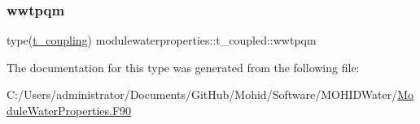 \mbox{\label{structmodulewaterproperties_1_1t__coupled_ad6256124275217622e92407a6bdac5ab}} 
\subsubsection{\texorpdfstring{wwtpqm}{wwtpqm}}
{\footnotesize\ttfamily type(\mbox{\hyperlink{structmodulewaterproperties_1_1t__coupling}{t\+\_\+coupling}}) modulewaterproperties\+::t\+\_\+coupled\+::wwtpqm\hspace{0.3cm}{\ttfamily [private]}}



The documentation for this type was generated from the following file\+:\begin{DoxyCompactItemize}
\item 
C\+:/\+Users/administrator/\+Documents/\+Git\+Hub/\+Mohid/\+Software/\+M\+O\+H\+I\+D\+Water/\mbox{\hyperlink{_module_water_properties_8_f90}{Module\+Water\+Properties.\+F90}}\end{DoxyCompactItemize}
